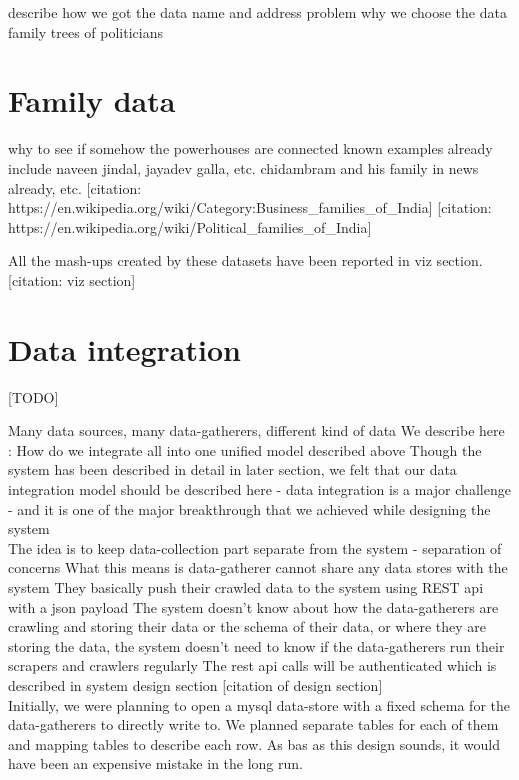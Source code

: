 describe how we got the data
name and address problem
why we choose the data family trees of politicians




\section{Family data}

why to see if somehow the powerhouses are connected 
known examples already include naveen jindal, jayadev galla, etc.
chidambram and his family in news already, etc.
[citation: https://en.wikipedia.org/wiki/Category:Business\_families\_of\_India]
[citation: https://en.wikipedia.org/wiki/Political\_families\_of\_India]

All the mash-ups created by these datasets have been reported in viz section. [citation: viz section]

\section{Data integration}

[TODO]

Many data sources, many data-gatherers, different kind of data
We describe here : How do we integrate all into one unified model described above
Though the system has been described in detail in later section, we felt that our data integration model should be described here - data integration is a major challenge - and it is one of the major breakthrough that we achieved while designing the system \\

The idea is to keep data-collection part separate from the system - separation of concerns
What this means is data-gatherer cannot share any data stores with the system
They basically push their crawled data to the system using REST api with a json payload
The system doesn't know about how the data-gatherers are crawling and storing their data or the schema of their data, or where they are storing the data,  the system doesn't need to know if the data-gatherers run their scrapers and crawlers regularly
The rest api calls will be authenticated which is described in system design section [citation of design section] \\

Initially, we were planning to open a mysql data-store with a fixed schema for the data-gatherers to directly write to. We planned separate tables for each of them and mapping tables to describe each row. As bas as this design sounds, it would have been an expensive mistake in the long run. \\

